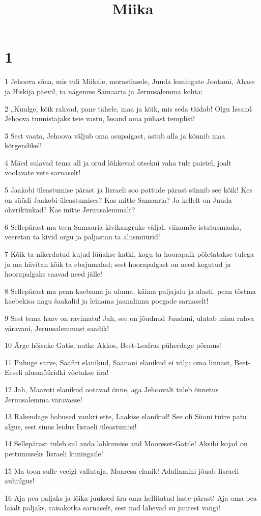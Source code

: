 

\title{Miika}

\chapter{1}

\par 1 Jehoova sõna, mis tuli Miikale, morastlasele, Juuda kuningate Jootami, Ahase ja Hiskija päevil, ta nägemus Samaaria ja Jeruusalemma kohta:
\par 2 „Kuulge, kõik rahvad, pane tähele, maa ja kõik, mis seda täidab! Olgu Issand Jehoova tunnistajaks teie vastu, Issand oma pühast templist!
\par 3 Sest vaata, Jehoova väljub oma asupaigast, astub alla ja kõnnib maa kõrgendikel!
\par 4 Mäed sulavad tema all ja orud lõhkevad otsekui vaha tule paistel, joalt voolavate vete sarnaselt!
\par 5 Jaakobi üleastumise pärast ja Iisraeli soo pattude pärast sünnib see kõik! Kes on süüdi Jaakobi üleastumises? Kas mitte Samaaria? Ja kellelt on Juuda ohvrikünkad? Kas mitte Jeruusalemmalt?
\par 6 Sellepärast ma teen Samaaria kivikangruks väljal, viinamäe istutusmaaks, veeretan ta kivid orgu ja paljastan ta alusmüürid!
\par 7 Kõik ta nikerdatud kujud lüüakse katki, kogu ta hoorapalk põletatakse tulega ja ma hävitan kõik ta ebajumalad; sest hoorapalgast on need kogutud ja hoorapalgaks saavad need jälle!
\par 8 Sellepärast ma pean kaebama ja uluma, käima paljajalu ja alasti, pean tõstma kaebekisa nagu šaakalid ja leinama jaanalinnu poegade sarnaselt!
\par 9 Sest tema haav on ravimatu! Jah, see on jõudnud Juudani, ulatab minu rahva väravani, Jeruusalemmast saadik!
\par 10 Ärge hõisake Gatis, nutke Akkos, Beet-Leafras püherdage põrmus!
\par 11 Puhuge sarve, Saafiri elanikud, Saanani elanikud ei välju oma linnast, Beet-Eeseli alusmüüridki võetakse ära!
\par 12 Jah, Maaroti elanikud ootavad õnne, aga Jehoovalt tuleb õnnetus Jeruusalemma väravasse!
\par 13 Rakendage hobused vankri ette, Laakise elanikud! See oli Siioni tütre patu algus, sest sinus leidus Iisraeli üleastumisi!
\par 14 Sellepärast tuleb sul anda lahkumise and Mooreset-Gatile! Aksibi kojad on pettumuseks Iisraeli kuningaile!
\par 15 Ma toon sulle veelgi vallutaja, Maaresa elanik! Adullamini jõuab Iisraeli auhiilgus!
\par 16 Aja pea paljaks ja lõika juuksed ära oma hellitatud laste pärast! Aja oma pea laialt paljaks, raisakotka sarnaselt, sest nad lähevad su juurest vangi!

